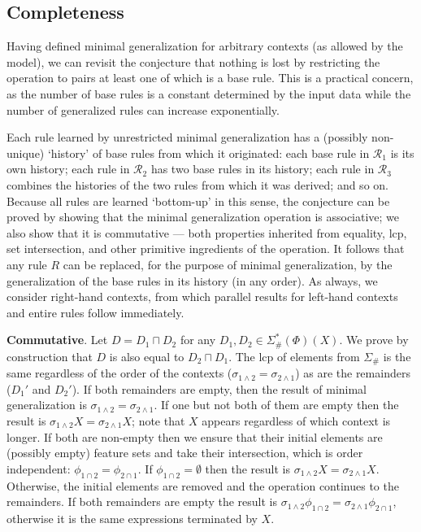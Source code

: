 \documentclass[11pt]{article}
\begin{document}
\subsection{Completeness}

Having defined minimal generalization for arbitrary contexts (as allowed by the model), we can revisit the conjecture that nothing is lost by restricting the operation to pairs at least one of which is a base rule. This is a practical concern, as the number of base rules is a constant determined by the input data while the number of generalized rules can increase exponentially.

Each rule learned by unrestricted minimal generalization has a (possibly non-unique) `history' of base rules from which it originated: each base rule in $\mathcal{R}_1$ is its own history; each rule in $\mathcal{R}_2$ has two base rules in its history; each rule in $\mathcal{R}_3$ combines the histories of the two rules from which it was derived; and so on. Because all rules are learned `bottom-up' in this sense, the conjecture can be proved by showing that the minimal generalization operation is associative; we also show that it is commutative --- both properties inherited from equality, lcp, set intersection, and other primitive ingredients of the operation. It follows that any rule $R$ can be replaced, for the purpose of minimal generalization, by the generalization of the base rules in its history (in any order). As always, we consider right-hand contexts, from which parallel results for left-hand contexts and entire rules follow immediately.

\textbf{Commutative}. Let $D = D_1 \sqcap D_2$ for any $D_1, D_2 \in \Sigma_{\#}^*(\Phi)(X)$. We prove by construction that $D$ is also equal to $D_2 \sqcap D_1$. The lcp of elements from $\Sigma_{\#}$ is the same regardless of the order of the contexts ($\sigma_{1\land 2} = \sigma_{2\land 1}$) as are the remainders ($D_1'$ and $D_2'$). If both remainders are empty, then the result of minimal generalization is $\sigma_{1\land 2} = \sigma_{2\land 1}$. If one but not both of them are empty then the result is $\sigma_{1\land 2}X = \sigma_{2\land 1}X$; note that $X$ appears regardless of which context is longer. If both are non-empty then we ensure that their initial elements are (possibly empty) feature sets and take their intersection, which is order independent: $\phi_{1\cap 2} = \phi_{2\cap 1}$. If $\phi_{1\cap 2} = \emptyset$ then the result is $\sigma_{1\land 2}X = \sigma_{2\land 1}X$. Otherwise, the initial elements are removed and the operation continues to the remainders. If both remainders are empty the result is $\sigma_{1\land 2}\phi_{1\cap 2} = \sigma_{2\land 1}\phi_{2\cap 1}$, otherwise it is the same expressions terminated by $X$.
\end{document}
